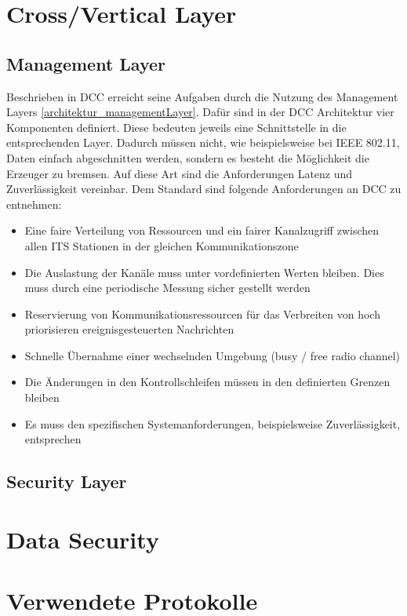 \section{Cross/Vertical Layer}
\subsection{Management Layer \label{architektur_managementLayer}}
Beschrieben in \cite{etsi102723-2}
\ac{DCC} erreicht seine Aufgaben durch die Nutzung des Management Layers \ref{architektur_managementLayer}. Dafür sind in der \ac{DCC} Architektur vier Komponenten definiert. Diese bedeuten jeweils eine Schnittstelle in die entsprechenden Layer. Dadurch müssen nicht, wie beispielsweise bei IEEE 802.11, Daten einfach abgeschnitten werden, sondern es besteht die Möglichkeit die Erzeuger zu bremsen. Auf diese Art sind die Anforderungen Latenz und Zuverlässigkeit vereinbar.  Dem Standard \cite{etsi102687} sind folgende Anforderungen an \ac{DCC} zu entnehmen:
\begin{itemize}
	\item Eine faire Verteilung von Ressourcen und ein fairer Kanalzugriff zwischen allen \ac{ITS} Stationen in der gleichen Kommunikationszone
	\item Die Auslastung der Kanäle muss unter vordefinierten Werten bleiben. Dies muss durch eine periodische Messung sicher gestellt werden
	\item Reservierung von Kommunikationsressourcen für das Verbreiten von hoch priorisieren ereignisgesteuerten Nachrichten
	\item Schnelle Übernahme einer wechselnden Umgebung (busy / free radio channel)
	\item Die Änderungen in den Kontrollschleifen müssen in den definierten Grenzen bleiben
	\item Es muss den spezifischen Systemanforderungen, beispielsweise Zuverlässigkeit, entsprechen
\end{itemize}

\subsection{Security Layer \label{architektur_securityLayer}}


\section{Data Security}

\section{Verwendete Protokolle}



